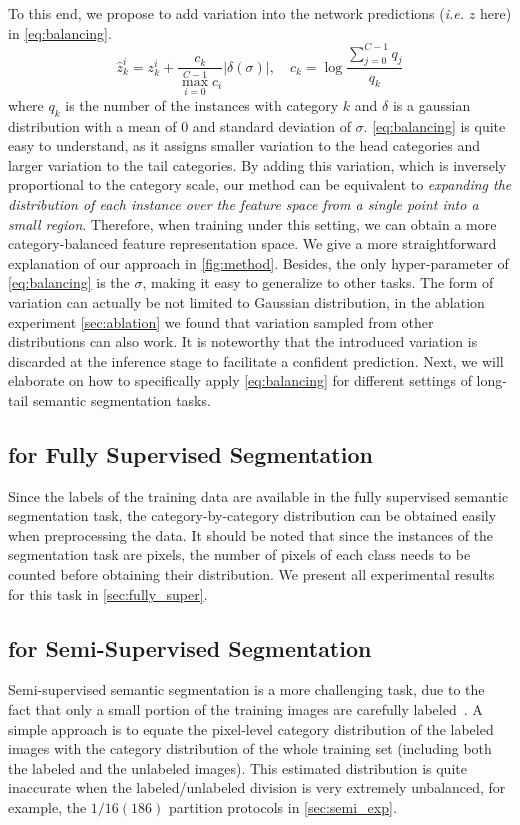 To this end, we propose to add variation into the network predictions (\textit{i.e.} $z$ here) in \cref{eq:balancing}.
\begin{equation}\label{eq:balancing}
    \hat{z}^{i}_{k} = z^{i}_{k} + \frac{c_{k}}{\max_{i=0}^{C-1}c_{i}}|\delta(\sigma)|, \quad c_{k} =\log \frac{\sum_{j=0}^{C-1}q_{j}}{q_{k}}
\end{equation}
where $q_{k}$ is the number of the instances with category $k$ and $\delta$ is a gaussian distribution with a mean of \textbf{$0$} and standard deviation of $\sigma$.
%
\cref{eq:balancing} is quite easy to understand, as it assigns smaller variation to the head categories and larger variation to the tail categories.
%
By adding this variation, which is inversely proportional to the category scale, our method can be equivalent to \textit{expanding the distribution of each instance over the feature space from a single point into a small region}.
%
Therefore, when training under this setting, we can obtain a more category-balanced feature representation space.
%
We give a more straightforward explanation of our approach in \cref{fig:method}.
%
Besides, the only hyper-parameter of \cref{eq:balancing} is the $\sigma$, making it easy to generalize to other tasks.
%
The form of variation can actually be not limited to Gaussian distribution, in the ablation experiment \cref{sec:ablation} we found that variation sampled from other distributions can also work.
%
It is noteworthy that the introduced variation is discarded at the inference stage to facilitate a confident prediction.
%
Next, we will elaborate on how to specifically apply \cref{eq:balancing} for different settings of long-tail semantic segmentation tasks.

\subsection{\method for Fully Supervised Segmentation}\label{sec:method_2}
Since the labels of the training data are available in the fully supervised semantic segmentation task, the category-by-category distribution can be obtained easily when preprocessing the data.
%
It should be noted that since the instances of the segmentation task are pixels, the number of pixels of each class needs to be counted before obtaining their distribution.
%
We present all experimental results for this task in \cref{sec:fully_super}.
%
\subsection{\method for Semi-Supervised Segmentation}\label{sec:method_3}
Semi-supervised semantic segmentation is a more challenging task, due to the fact that only a small portion of the training images are carefully labeled~\cite{zhang2020survey}.
%
A simple approach is to equate the pixel-level category distribution of the labeled images with the category distribution of the whole training set (including both the labeled and the unlabeled images).
%
This estimated distribution is quite inaccurate when the labeled/unlabeled division is very extremely unbalanced, for example, the $1/16 (186)$ partition protocols in \cref{sec:semi_exp}. 

